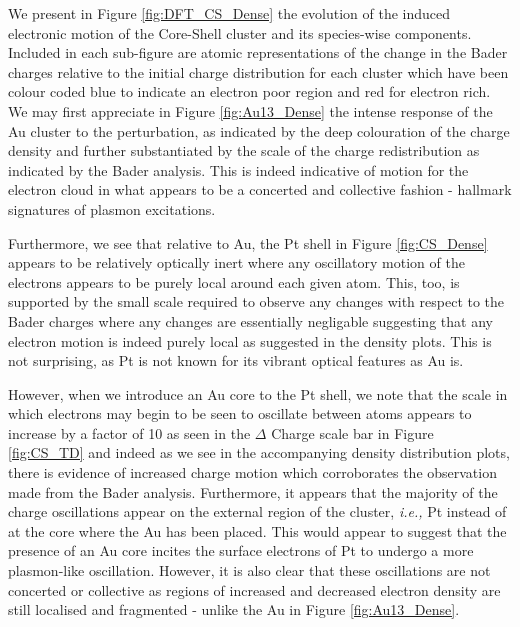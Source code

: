 We present in Figure \ref{fig:DFT_CS_Dense} the evolution of the induced electronic motion of the Core-Shell cluster and its species-wise components. Included in each sub-figure are atomic representations of the change in the Bader charges \cite{Bader} relative to the initial charge distribution for each cluster which have been colour coded blue to indicate an electron poor region and red for electron rich. We may first appreciate in Figure \ref{fig:Au13_Dense} the intense response of the Au cluster to the perturbation, as indicated by the deep colouration of the charge density and further substantiated by the scale of the charge redistribution as indicated by the Bader analysis. This is indeed indicative of motion for the electron cloud in what appears to be a concerted and collective fashion - hallmark signatures of plasmon excitations. 

Furthermore, we see that relative to Au, the Pt shell in Figure \ref{fig:CS_Dense} appears to be relatively optically inert where any oscillatory motion of the electrons appears to be purely local around each given atom. This, too, is supported by the small scale required to observe any changes with respect to the Bader charges where any changes are essentially negligable suggesting that any electron motion is indeed purely local as suggested in the density plots. This is not surprising, as Pt is not known for its vibrant optical features as Au is.

However, when we introduce an Au core to the Pt shell, we note that the scale in which electrons may begin to be seen to oscillate between atoms appears to increase by a factor of 10 as seen in the $\Delta$ Charge scale bar in Figure \ref{fig:CS_TD} and indeed as we see in the accompanying density distribution plots, there is evidence of increased charge motion which corroborates the observation made from the Bader analysis. Furthermore, it appears that the majority of the charge oscillations appear on the external region of the cluster, \textit{i.e.,} Pt instead of at the core where the Au has been placed. This would appear to suggest that the presence of an Au core incites the surface electrons of Pt to undergo a more plasmon-like oscillation. However, it is also clear that these oscillations are not concerted or collective as regions of increased and decreased electron density are still localised and fragmented - unlike the Au in Figure \ref{fig:Au13_Dense}.

